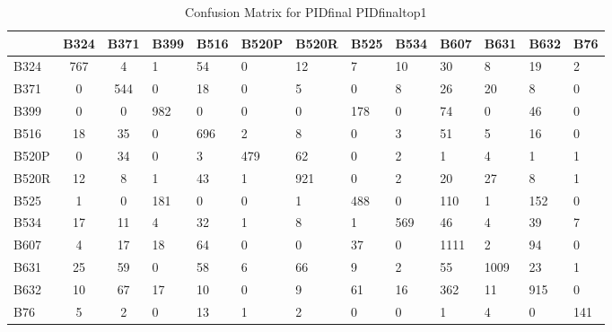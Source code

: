 \begin{table}[htbp]
\centering
\caption{Confusion Matrix for PIDfinal PIDfinaltop1}
\label{tab:confusionmatrix.PIDfinal.PIDfinaltop1}
\begin{tabular}{|l|cc|}
\toprule
 & B324 & B371 & B399 & B516 & B520P & B520R & B525 & B534 & B607 & B631 & B632 & B76 \\
\midrule
B324 & 767 & 4 & 1 & 54 & 0 & 12 & 7 & 10 & 30 & 8 & 19 & 2 \\
B371 & 0 & 544 & 0 & 18 & 0 & 5 & 0 & 8 & 26 & 20 & 8 & 0 \\
B399 & 0 & 0 & 982 & 0 & 0 & 0 & 178 & 0 & 74 & 0 & 46 & 0 \\
B516 & 18 & 35 & 0 & 696 & 2 & 8 & 0 & 3 & 51 & 5 & 16 & 0 \\
B520P & 0 & 34 & 0 & 3 & 479 & 62 & 0 & 2 & 1 & 4 & 1 & 1 \\
B520R & 12 & 8 & 1 & 43 & 1 & 921 & 0 & 2 & 20 & 27 & 8 & 1 \\
B525 & 1 & 0 & 181 & 0 & 0 & 1 & 488 & 0 & 110 & 1 & 152 & 0 \\
B534 & 17 & 11 & 4 & 32 & 1 & 8 & 1 & 569 & 46 & 4 & 39 & 7 \\
B607 & 4 & 17 & 18 & 64 & 0 & 0 & 37 & 0 & 1111 & 2 & 94 & 0 \\
B631 & 25 & 59 & 0 & 58 & 6 & 66 & 9 & 2 & 55 & 1009 & 23 & 1 \\
B632 & 10 & 67 & 17 & 10 & 0 & 9 & 61 & 16 & 362 & 11 & 915 & 0 \\
B76 & 5 & 2 & 0 & 13 & 1 & 2 & 0 & 0 & 1 & 4 & 0 & 141 \\
\bottomrule
\end{tabular}
\end{table}
